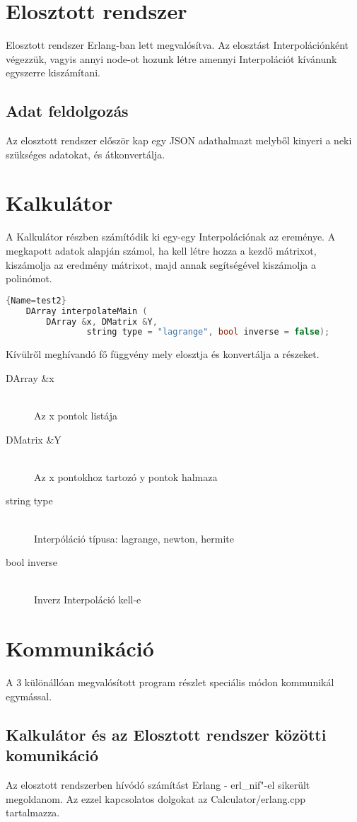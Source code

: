 \documentclass{elteikthesis}
\begin{document}
\section{Elosztott rendszer}
Elosztott rendszer Erlang-ban lett megvalósítva. Az elosztást Interpolációnként végezzük, vagyis annyi node-ot hozunk létre amennyi Interpolációt kívánunk egyszerre kiszámítani.
\subsection{Adat feldolgozás}
Az elosztott rendszer először kap egy JSON adathalmazt melyből kinyeri a neki szükséges adatokat, és átkonvertálja.

\section{Kalkulátor}
A Kalkulátor részben számítódik ki egy-egy Interpolációnak az ereménye.
A megkapott adatok alapján számol, ha kell létre hozza a kezdő mátrixot, kiszámolja az eredmény mátrixot, majd annak segítségével kiszámolja a polinómot.
\begin{lstlisting}[language=C++]{Name=test2}
	DArray interpolateMain (
		DArray &x, DMatrix &Y, 
				string type = "lagrange", bool inverse = false);
\end{lstlisting}
	Kívülről meghívandó fő függvény mely elosztja és konvertálja a részeket. 
	\begin{description}
	  \item[DArray \&x] \hfill \\ Az x pontok listája 
	  \item[DMatrix \&Y] \hfill \\ Az x pontokhoz tartozó y pontok halmaza
	  \item[string type] \hfill \\ Interpóláció típusa: lagrange, newton, hermite
	  \item[bool inverse] \hfill \\ Inverz Interpoláció kell-e
	\end{description}


\section{Kommunikáció}
A 3 különállóan megvalósított program részlet speciális módon kommunikál egymással. 
\subsection{Kalkulátor és az Elosztott rendszer közötti komunikáció} 
Az elosztott rendszerben hívódó számítást Erlang - erl\_nif"-el sikerült megoldanom. 
Az ezzel kapcsolatos dolgokat az Calculator/erlang.cpp tartalmazza. 
\end{document}
